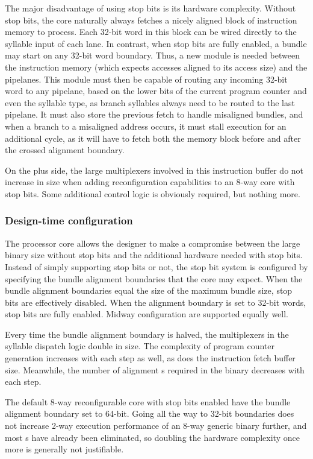 The major disadvantage of using stop bits is its hardware complexity. Without 
stop bits, the core naturally always fetches a nicely aligned block of 
instruction memory to process. Each 32-bit word in this block can be wired 
directly to the syllable input of each lane. In contrast, when stop bits are 
fully enabled, a bundle may start on any 32-bit word boundary. Thus, a new 
module is needed between the instruction memory (which expects accesses aligned 
to its access size) and the pipelanes. This module must then be capable of 
routing any incoming 32-bit word to any pipelane, based on the lower bits of the 
current program counter and even the syllable type, as branch syllables always 
need to be routed to the last pipelane. It must also store the previous fetch to 
handle misaligned bundles, and when a branch to a misaligned address occurs, it 
must stall execution for an additional cycle, as it will have to fetch both the 
memory block before and after the crossed alignment boundary.

On the plus side, the large multiplexers involved in this instruction buffer do
not increase in size when adding reconfiguration capabilities to an 8-way core
with stop bits. Some additional control logic is obviously required, but nothing
more.

\subsubsection{Design-time configuration}
\label{ref:core-ug-isa-sbit-cfg}

The \rvex{} processor core allows the designer to make a compromise between the
large binary size without stop bits and the additional hardware needed with stop
bits. Instead of simply supporting stop bits or not, the stop bit system is
configured by specifying the bundle alignment boundaries that the core may
expect. When the bundle alignment boundaries equal the size of the maximum
bundle size, stop bits are effectively disabled. When the alignment boundary is
set to 32-bit words, stop bits are fully enabled. Midway configuration are
supported equally well.

Every time the bundle alignment boundary is halved, the multiplexers in the
syllable dispatch logic double in size. The complexity of program counter
generation increases with each step as well, as does the instruction fetch
buffer size. Meanwhile, the number of alignment s required in the
binary decreases with each step.

The default 8-way reconfigurable core with stop bits enabled have the bundle
alignment boundary set to 64-bit. Going all the way to 32-bit boundaries does
not increase 2-way execution performance of an 8-way generic binary further, and
most s have already been eliminated, so doubling the hardware
complexity once more is generally not justifiable.

